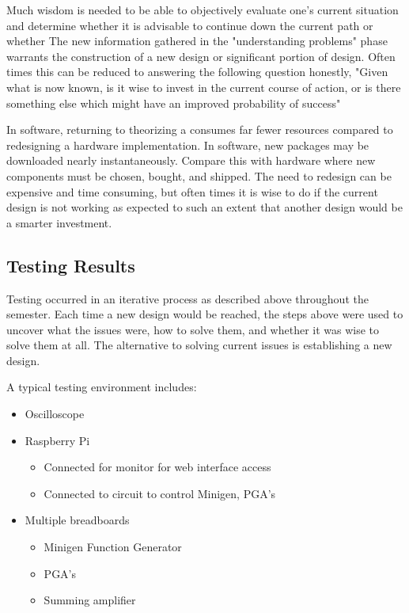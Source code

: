 \documentclass{article}	%
\begin{document}
\begin{multicols}{2}
Much wisdom is needed to be able to objectively 
evaluate one's current situation and determine 
whether it is advisable to
continue down the current path or whether
The new information gathered in the "understanding problems" phase
warrants the construction of a new design 
or significant portion of design.
Often times this can be reduced to answering the following question honestly,
"Given what is now known,
is it wise to invest in the current course of action, or
is there something else which might have an improved probability of success"

In software,
returning to theorizing a consumes far fewer resources compared
to redesigning a hardware implementation.
In software,
new packages may be downloaded nearly instantaneously.
Compare this with hardware where new components must
be chosen, bought, and shipped.
The need to redesign can be expensive and time consuming, but
often times it is wise to do if the current design is not working as expected
to such an extent that another design would be a smarter investment.

\subsection{Testing Results}
Testing occurred in an iterative process
as described above throughout the semester.
Each time a new design would be reached,
the steps above were used to uncover what
the issues were, 
how to solve them, and
whether it was wise to solve them at all.
The alternative to solving current issues is
establishing a new design.

A typical testing environment includes:
\begin{itemize}
\item Oscilloscope
\item Raspberry Pi
  \begin{itemize}
  \item Connected for monitor for web interface access
  \item Connected to circuit to control Minigen, PGA's
  \end{itemize}
\item Multiple breadboards
  \begin{itemize}
  \item Minigen Function Generator
  \item PGA's
  \item Summing amplifier
  \end{itemize}
\end{itemize}


\end{multicols}
\end{document}
